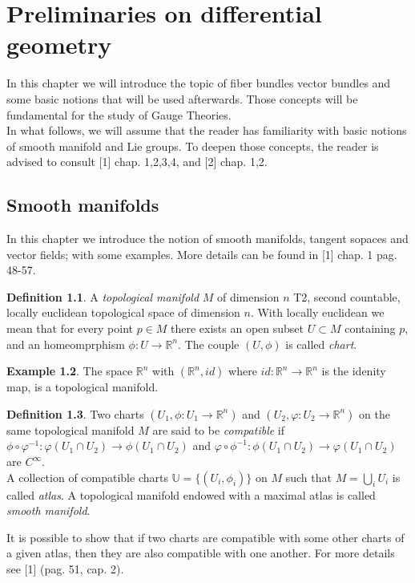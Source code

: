 \documentclass[12pt,a4paper]{report}
\theoremstyle{definition}
\newtheorem{Def}{Definition}[chapter]
\theoremstyle{Theorem}
\theoremstyle{definition}
\newtheorem{Ex}[Def]{Example}
\theoremstyle{definition}
\begin{document}
	\chapter{Preliminaries on differential geometry}
		In this chapter we will introduce the topic of fiber bundles vector bundles and some basic notions that will be used afterwards. Those concepts will be fundamental for the study of Gauge Theories.\\
		In what follows, we will assume that the reader has familiarity with basic notions of smooth manifold and Lie groups. To deepen those concepts, the reader is advised to consult [1] chap. 1,2,3,4, and [2] chap. 1,2.
		\section{Smooth manifolds}
		In this chapter we introduce the notion of smooth manifolds, tangent sopaces and vector fields; with some examples. More details can be found in [1] chap. 1 pag. 48-57.
		\begin{Def}
			A \textit{topological manifold} $M$ of dimension $n$ T2, second countable, locally euclidean topological space of dimension $n$. With locally euclidean we mean that for every point $p\in M$ there exists an open subset $U\subset M$ containing $p$, and an homeomprphism $\phi:U\rightarrow\mathbb{R}^n$. The couple $(U,\phi)$ is called \textit{chart}. 
		\end{Def}
		\begin{Ex}
			The space $\mathbb{R}^n$ with $(\mathbb{R}^n, id)$ where $id:\mathbb{R}^n\rightarrow \mathbb{R}^n$ is the idenity map, is a topological manifold. 
		\end{Ex}
		\begin{Def}
			Two charts $(U_1,\phi:U_1\rightarrow\mathbb{R}^n)$ and $(U_2,\varphi:U_2\rightarrow\mathbb{R}^n)$ on the same topological manifold $M$ are said to be \textit{compatible} if
			$\phi\circ\varphi^{-1}:\varphi(U_1\cap U_2)\rightarrow \phi(U_1\cap U_2)$ and $\varphi\circ\phi^{-1}:\phi(U_1\cap U_2)\rightarrow \varphi(U_1\cap U_2)$ are $C^\infty$.\\
			A collection of compatible charts $\mathbb{U}=\{(U_i,\phi_{i})\}$ on $M$ such that $M=\bigcup_i U_i$ is called \textit{atlas}. A topological manifold endowed with a maximal atlas is called \textit{smooth manifold}.
		\end{Def}
		It is possible to show that if two charts are compatible with some other charts of a given atlas, then they are also compatible with one another. For more details see [1] (pag. 51, cap. 2).
\end{document}
